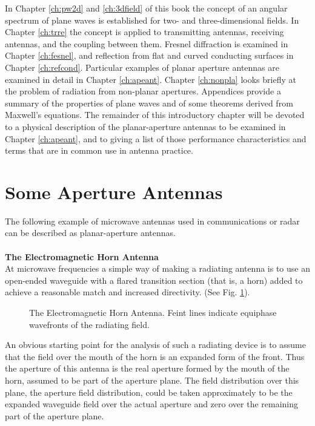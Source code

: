 In Chapter \ref{ch:pw2d} and \ref{ch:3dfield} of this book the concept of an angular spectrum of plane waves is established for two- and three-dimensional fields. In Chapter \ref{ch:trre} the concept is applied to transmitting antennas, receiving antennas, and the coupling between them. Fresnel diffraction is examined in Chapter \ref{ch:fesnel}, and reflection from flat and curved conducting surfaces in Chapter \ref{ch:refcond}. Particular examples of planar aperture antennas are examined in detail in Chapter \ref{ch:apeant}. Chapter \ref{ch:nonpla} looks briefly at the problem of radiation from non-planar apertures. Appendices provide a summary of the properties of plane waves and of some theorems derived from Maxwell's equations. The remainder of this introductory chapter will be devoted to a physical description of the planar-aperture antennas to be examined in Chapter \ref{ch:apeant}, and to giving a list of those performance characteristics and terms that are in common use in antenna practice.

\section{Some Aperture Antennas}
The following example of microwave antennas used in communications or radar can be described as planar-aperture antennas.\\
\\
\textbf{The Electromagnetic Horn Antenna}\\
At microwave frequencies a simple way of making a radiating antenna is to use an open-ended waveguide with a flared transition section (that is, a horn) added to achieve a reasonable match and increased directivity. (See Fig. \ref{fig:horn}).
\begin{figure}[htbp]
	\begin{center}
	\end{center}
	\caption{The Electromagnetic Horn Antenna. Feint lines indicate equiphase wavefronts of the radiating field.}
	\label{fig:horn}
\end{figure}

An obvious starting point for the analysis of such a radiating device is to assume that the field over the mouth of the horn is an expanded form of the front. Thus the aperture of this antenna is the real aperture formed by the mouth of the horn, assumed to be part of the aperture plane. The field distribution over this plane, the aperture field distribution, could be taken approximately to be the expanded waveguide field over the actual aperture and zero over the remaining part of the aperture plane.

